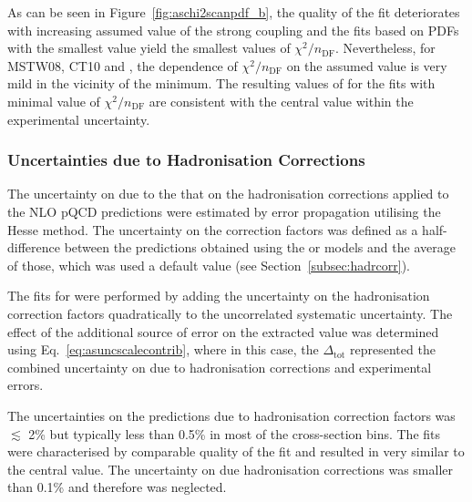 As can be seen in Figure~\ref{fig:aschi2scanpdf_b}, the quality of the fit deteriorates with increasing assumed value of the strong coupling and the fits based on PDFs with the smallest \asz value yield the smallest values of $\chi^2/n_\text{DF}$. Nevertheless, for MSTW08, CT10 and , the dependence of $\chi^2/n_\text{DF}$ on the assumed value is very mild in the vicinity of the minimum. The resulting values of \as for the fits with minimal value of $\chi^2/n_\text{DF}$ are consistent with the central value within the experimental uncertainty.

\subsubsection{Uncertainties due to Hadronisation Corrections}
\label{subsec:ashadrunc}
The uncertainty on \as due to the that on the hadronisation corrections applied to the NLO pQCD predictions were estimated by error propagation utilising the Hesse method. The uncertainty on the correction factors was defined as a half-difference between the predictions obtained using the \ariadne or \lepto models and the average of those, which was used a default value (see Section~\ref{subsec:hadrcorr}).

The fits for \as were performed by adding the uncertainty on the hadronisation correction factors quadratically to the uncorrelated systematic uncertainty. The effect of the additional source of error on the extracted \asz value was determined using Eq.~\eqref{eq:asuncscalecontrib}, where in this case, the $\Delta_\text{tot}$ represented the combined uncertainty on \as due to hadronisation corrections and experimental errors.

The uncertainties on the predictions due to hadronisation correction factors was $\lesssim$ 2\% but typically less than 0.5\% in most of the cross-section bins. The \as fits were characterised by comparable quality of the fit and resulted in \asz very similar to the central value. The uncertainty on \asz due hadronisation corrections was smaller than 0.1\% and therefore was neglected.